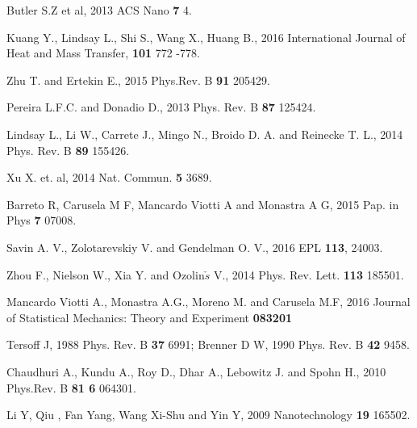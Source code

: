 \documentclass[12pt]{article}
\begin{document}
\begin{thebibliography}{99}
 Butler S.Z et al, 2013 ACS Nano {\bf 7} 4.


 Kuang Y., Lindsay L., Shi S., Wang X., Huang B., 2016 International Journal of Heat and Mass Transfer, {\bf 101} 772 -778.

 Zhu T. and Ertekin E., 2015 Phys.Rev. B {\bf 91} 205429.

 Pereira L.F.C. and Donadio D., 2013 Phys. Rev. B {\bf 87} 125424.

 Lindsay L., Li W., Carrete J., Mingo N., Broido D. A. and Reinecke T. L., 2014 Phys. Rev. B {\bf 89} 155426.

 Xu X. et. al, 2014 Nat. Commun. {\bf 5} 3689.

 Barreto R, Carusela M F, Mancardo Viotti A and Monastra A G, 2015 Pap. in Phys {\bf 7} 07008.

 Savin A. V., Zolotarevskiy  V. and  Gendelman O. V., 2016 EPL {\bf 113}, 24003.

 Zhou F., Nielson W., Xia Y. and Ozolin$\check{s}$ V., 2014 Phys. Rev. Lett. {\bf  113} 185501.

 Mancardo Viotti A., Monastra A.G., Moreno M. and Carusela M.F, 2016 Journal of Statistical Mechanics: Theory and Experiment {\bf 083201}

 Tersoff J, 1988 Phys. Rev. B {\bf 37} 6991; Brenner D W, 1990 Phys. Rev. B {\bf 42} 9458.

 Chaudhuri A., Kundu  A., Roy D., Dhar A., Lebowitz J. and Spohn H., 2010 Phys.Rev. B {\bf 81 6} 064301.

Li Y, Qiu , Fan Yang, Wang Xi-Shu and Yin Y, 2009 Nanotechnology {\bf 19} 165502.








\end{thebibliography}
\end{document}

